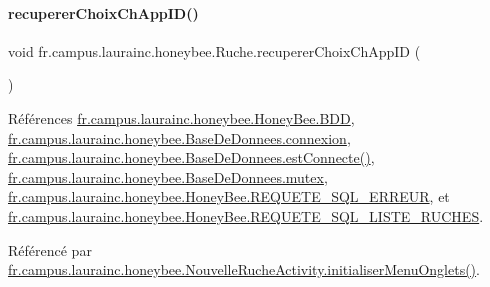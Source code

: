 \paragraph{\texorpdfstring{recuperer\+Choix\+Ch\+App\+I\+D()}{recupererChoixChAppID()}}
{\footnotesize\ttfamily void fr.\+campus.\+laurainc.\+honeybee.\+Ruche.\+recuperer\+Choix\+Ch\+App\+ID (\begin{DoxyParamCaption}{ }\end{DoxyParamCaption})}



Références \hyperlink{classfr_1_1campus_1_1laurainc_1_1honeybee_1_1_honey_bee_abfb4f6cc1c8bb793c37ccb8408abc51c}{fr.\+campus.\+laurainc.\+honeybee.\+Honey\+Bee.\+B\+DD}, \hyperlink{classfr_1_1campus_1_1laurainc_1_1honeybee_1_1_base_de_donnees_a358899633f17b8cd00dd2c4cfdd40abe}{fr.\+campus.\+laurainc.\+honeybee.\+Base\+De\+Donnees.\+connexion}, \hyperlink{classfr_1_1campus_1_1laurainc_1_1honeybee_1_1_base_de_donnees_a735f54c2c183a595c9a9a5ba947491f5}{fr.\+campus.\+laurainc.\+honeybee.\+Base\+De\+Donnees.\+est\+Connecte()}, \hyperlink{classfr_1_1campus_1_1laurainc_1_1honeybee_1_1_base_de_donnees_a0dd6f285a11459c086adea6080bed282}{fr.\+campus.\+laurainc.\+honeybee.\+Base\+De\+Donnees.\+mutex}, \hyperlink{classfr_1_1campus_1_1laurainc_1_1honeybee_1_1_honey_bee_a275b7a8582c8193ff444d21928ef7e36}{fr.\+campus.\+laurainc.\+honeybee.\+Honey\+Bee.\+R\+E\+Q\+U\+E\+T\+E\+\_\+\+S\+Q\+L\+\_\+\+E\+R\+R\+E\+UR}, et \hyperlink{classfr_1_1campus_1_1laurainc_1_1honeybee_1_1_honey_bee_afd5c8c4447e00d9a75eb95f83a62a860}{fr.\+campus.\+laurainc.\+honeybee.\+Honey\+Bee.\+R\+E\+Q\+U\+E\+T\+E\+\_\+\+S\+Q\+L\+\_\+\+L\+I\+S\+T\+E\+\_\+\+R\+U\+C\+H\+ES}.



Référencé par \hyperlink{classfr_1_1campus_1_1laurainc_1_1honeybee_1_1_nouvelle_ruche_activity_ad9bdfb01df8d7402b4da9858f263e1fd}{fr.\+campus.\+laurainc.\+honeybee.\+Nouvelle\+Ruche\+Activity.\+initialiser\+Menu\+Onglets()}.


